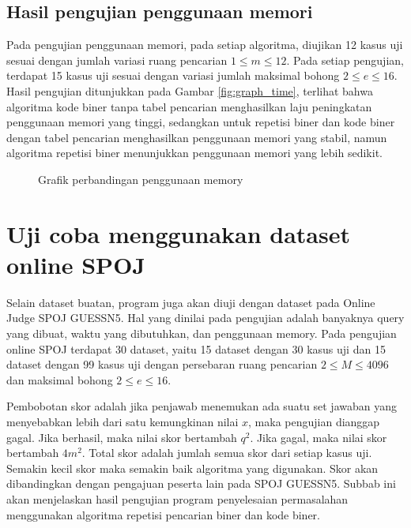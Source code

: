 \subsection{Hasil pengujian penggunaan memori}

Pada pengujian penggunaan memori, pada setiap algoritma, diujikan 12 kasus uji sesuai dengan jumlah variasi ruang pencarian $1 \leq m \leq 12$. Pada setiap pengujian, terdapat 15 kasus uji sesuai dengan variasi jumlah maksimal bohong $2 \leq e \leq 16$. Hasil pengujian ditunjukkan pada Gambar \ref{fig:graph_time}, terlihat bahwa algoritma kode biner tanpa tabel pencarian menghasilkan laju peningkatan penggunaan memori yang tinggi, sedangkan untuk repetisi biner dan kode biner dengan tabel pencarian menghasilkan penggunaan memori yang stabil, namun algoritma repetisi biner menunjukkan penggunaan memori yang lebih sedikit.

\begin{figure}
\centering
{}
\caption{Grafik perbandingan penggunaan memory}
\label{fig:graph_memory}
\end{figure}

\section{Uji coba menggunakan dataset online SPOJ}

Selain dataset buatan, program juga akan diuji dengan dataset pada Online Judge SPOJ GUESSN5. Hal yang dinilai pada pengujian adalah banyaknya query yang dibuat, waktu yang dibutuhkan, dan penggunaan memory. Pada pengujian online SPOJ terdapat 30 dataset, yaitu 15 dataset dengan 30 kasus uji dan 15 dataset dengan 99 kasus uji dengan persebaran ruang pencarian $2 \leq M \leq 4096$ dan maksimal bohong $2 \leq e \leq 16$.

Pembobotan skor adalah jika penjawab menemukan ada suatu set jawaban yang menyebabkan lebih dari satu kemungkinan nilai $x$, maka pengujian dianggap gagal. Jika berhasil, maka nilai skor bertambah $q^2$. Jika gagal, maka nilai skor bertambah $4m^2$. Total skor adalah jumlah semua skor dari setiap kasus uji. Semakin kecil skor maka semakin baik algoritma yang digunakan. Skor akan dibandingkan dengan pengajuan peserta lain pada SPOJ GUESSN5. Subbab ini akan menjelaskan hasil pengujian program penyelesaian permasalahan menggunakan algoritma repetisi pencarian biner dan kode biner.

